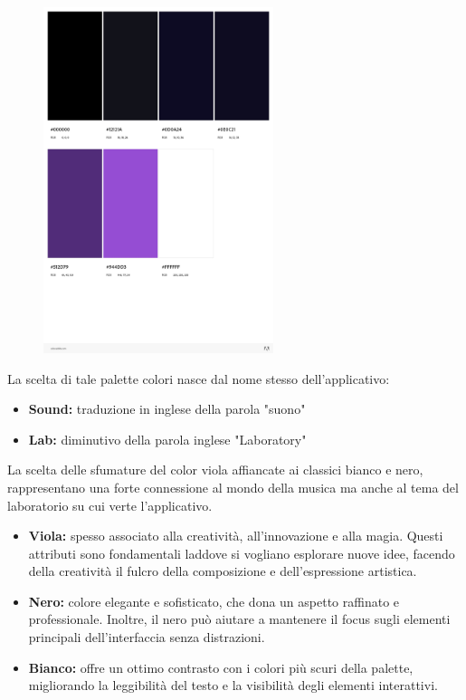 \documentclass{article}
\begin{document}
		\begin{figure}[H]
			\centering
			\includegraphics[width=0.6\textwidth]{Immagini/palette}
		\end{figure}
		La scelta di tale palette colori nasce dal nome stesso dell'applicativo:
		\begin{itemize}
			\item \textbf{Sound:} traduzione in inglese della parola "suono"
			\item \textbf{Lab:} diminutivo della parola inglese "Laboratory"
		\end{itemize}
		La scelta delle sfumature del color viola affiancate ai classici bianco e nero, rappresentano una forte connessione al mondo della musica ma anche al tema del laboratorio su cui verte l'applicativo.
		\begin{itemize}
			\item \textbf{Viola:} spesso associato alla creatività, all'innovazione e alla magia. Questi attributi sono fondamentali laddove si vogliano esplorare nuove idee, facendo della creatività il fulcro della composizione e dell'espressione artistica.
			\item \textbf{Nero:} colore elegante e sofisticato, che dona un aspetto raffinato e professionale. Inoltre, il nero può aiutare a mantenere il focus sugli elementi principali dell'interfaccia senza distrazioni.
			\item \textbf{Bianco:} offre un ottimo contrasto con i colori più scuri della palette, migliorando la leggibilità del testo e la visibilità degli elementi interattivi.
		\end{itemize}
\end{document}
